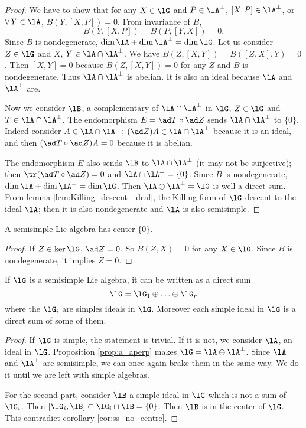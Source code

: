 \begin{proof}
We have to show that for any $X\in\lG$ and $P\in\lA^{\perp}$, $[X,P]\in\lA^{\perp}$, or $\forall\, Y\in\lA$, $B(Y,[X,P])=0$. From invariance of $B$,
\[
  B(Y,[X,P])=B(P,[Y,X])=0.
\]
Since $B$ is nondegenerate, $\dim\lA+\dim\lA^{\perp}=\dim\lG$. Let us consider $Z\in\lG$ and $X$, $Y\in\lA\cap\lA^{\perp}$. We have $B(Z,[X,Y])=B([Z,X],Y)=0$. Then $[X,Y]=0$ because $B(Z,[X,Y])=0$ for any $Z$ and $B$ is nondegenerate. Thus $\lA\cap\lA^{\perp}$ is abelian. It is also an ideal because $\lA$ and $\lA^{\perp}$ are.

Now we consider $\lB$, a complementary of $\lA\cap\lA^{\perp}$ in $\lG$, $Z\in\lG$ and $T\in\lA\cap\lA^{\perp}$. The endomorphism $E=\ad T\circ\ad Z$ sends $\lA\cap\lA^{\perp}$ to $\{0\}$. Indeed consider $A\in\lA\cap\lA^{\perp}$; $(\ad Z) A\in\lA\cap\lA^{\perp}$ because it is an ideal, and then $(\ad T\circ\ad Z)A=0$ because it is abelian.

The endomorphism $E$ also sends $\lB$ to $\lA\cap\lA^{\perp}$ (it may not be surjective); then $\tr(\ad T\circ\ad Z)=0$ and $\lA\cap\lA^{\perp}=\{0\}$. Since $B$ is nondegenerate, $\dim\lA+\dim\lA^{\perp}=\dim\lG$. Then $\lA\oplus\lA^{\perp}=\lG$ is well a direct sum.
From lemma \ref{lem:Killing_descent_ideal}, the Killing form of $\lG$ descent to the ideal $\lA$; then it is also nondegenerate and $\lA$ is also semisimple.
 \end{proof}

\begin{corollary}
A semisimple Lie algebra has center $\{0\}$.
\label{cor:ss_no_centre}
\end{corollary}

\begin{proof}
If $Z\in\ker\lG$, $\ad Z=0$. So $B(Z,X)=0$ for any $X\in\lG$. Since $B$ is nondegenerate, it implies $Z=0$.
\end{proof}


\begin{corollary}
If $\lG$ is a semisimple Lie algebra, it can be written as a direct sum
\[
   \lG=\lG_1\oplus\ldots\oplus\lG_r
\]
where the $\lG_i$ are simples ideals in $\lG$. Moreover each simple ideal in $\lG$ is a direct sum of some of them.
\label{cor:decomp_ideal}
\end{corollary}

\begin{proof}
If $\lG$ is simple, the statement is trivial. If it is not, we consider $\lA$, an ideal in $\lG$.
Proposition \ref{prop:a_aperp} makes $\lG=\lA\oplus\lA^{\perp}$. Since $\lA$ and $\lA^{\perp}$ are semisimple, we can once again brake them in the same way. We do it until we are left with simple algebras.

For the second part, consider $\lB$ a simple ideal in $\lG$ which is not a sum of $\lG_i$. Then $[\lG_i,\lB]\subset\lG_i\cap\lB=\{0\}$. Then $\lB$ is in the center of $\lG$. This contradict corollary \ref{cor:ss_no_centre}.
\end{proof}

